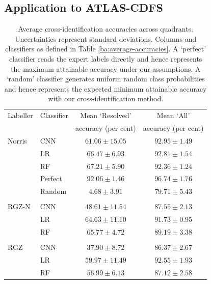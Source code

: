 \documentclass[fleqn,usenatbib,usedcolumn]{mnras}
\begin{document}
\subsection{Application to ATLAS-CDFS}
\begin{table}
    \caption{Average cross-identification accuracies across quadrants.
      Uncertainties represent standard deviations. Columns and classifiers as defined in Table \ref{ba:average-accuracies}.  A `perfect' classifier reads the
      expert labels directly and hence represents the maximum attainable
      accuracy under our assumptions. A `random' classifier generates uniform
      random class probabilities and hence represents the expected minimum
      attainable accuracy with our cross-identification method.}    
      \label{tab:cross-id-accuracies}
\begin{tabular}{llcc}
\hline
Labeller & Classifier  & Mean `Resolved' & Mean `All' \\
 & & accuracy (per cent) & accuracy (per cent)\\
\hline
Norris & CNN & $61.06 \pm 15.05$ & $92.95 \pm 1.49$\\
 & LR & $66.47 \pm 6.93$ & $92.81 \pm 1.54$\\
 & RF & $67.21 \pm 5.90$ & $92.36 \pm 1.24$\\
 & Perfect & $92.06 \pm 1.46$ & $96.74 \pm 1.76$\\
 & Random & $4.68 \pm 3.91$ & $79.71 \pm 5.43$\\
 \\
RGZ-N & CNN & $48.61 \pm 11.54$ & $87.55 \pm 2.13$\\
 & LR & $64.63 \pm 11.10$ & $91.73 \pm 0.95$\\
 & RF & $65.77 \pm 4.72$ & $89.19 \pm 3.38$\\
 \\
RGZ & CNN & $37.90 \pm 8.72$ & $86.37 \pm 2.67$\\
 & LR & $59.97 \pm 11.49$ & $92.55 \pm 1.93$\\
 & RF & $56.99 \pm 6.13$ & $87.12 \pm 2.58$\\
 \hline
\end{tabular}
\end{table}
\end{document}
